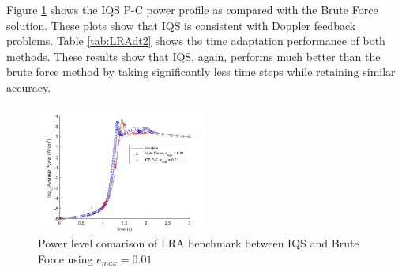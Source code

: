 \documentclass{anstrans}
\begin{document}
Figure \ref{fig:LRA_plots} shows the IQS P-C power profile as compared with the Brute Force solution.    These plots show that IQS is consistent with Doppler feedback problems.  Table  \ref{tab:LRAdt2} shows the time adaptation performance of both methods.  These results show that IQS, again, performs much better than the brute force method by taking significantly less time steps while retaining similar accuracy.

\begin{figure}[!htbp]
\begin{center}
\includegraphics[width=0.5\textwidth]{lra_power_profile.jpg}
\caption{Power level comarison of LRA benchmark between IQS and Brute Force using $e_{max} = 0.01$}
\label{fig:LRA_plots}
\end{center}
\end{figure}

\begin{table}[!htbp]
\begin{center}
\end{center}
\caption{LRA step doubling results}
\label{tab:LRAdt2}
\end{table}
\end{document}
